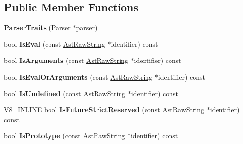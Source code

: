 \subsection*{Public Member Functions}
\begin{DoxyCompactItemize}
\item 
{\bfseries Parser\+Traits} (\hyperlink{classv8_1_1internal_1_1_parser}{Parser} $\ast$parser)\hypertarget{classv8_1_1internal_1_1_parser_traits_abfb6b57f03bde44ebd57ba82060e853c}{}\label{classv8_1_1internal_1_1_parser_traits_abfb6b57f03bde44ebd57ba82060e853c}

\item 
bool {\bfseries Is\+Eval} (const \hyperlink{classv8_1_1internal_1_1_ast_raw_string}{Ast\+Raw\+String} $\ast$identifier) const \hypertarget{classv8_1_1internal_1_1_parser_traits_afba95e19eb7118575931870015f0bf1f}{}\label{classv8_1_1internal_1_1_parser_traits_afba95e19eb7118575931870015f0bf1f}

\item 
bool {\bfseries Is\+Arguments} (const \hyperlink{classv8_1_1internal_1_1_ast_raw_string}{Ast\+Raw\+String} $\ast$identifier) const \hypertarget{classv8_1_1internal_1_1_parser_traits_a604e49310c1454c26b9d67a19098b06d}{}\label{classv8_1_1internal_1_1_parser_traits_a604e49310c1454c26b9d67a19098b06d}

\item 
bool {\bfseries Is\+Eval\+Or\+Arguments} (const \hyperlink{classv8_1_1internal_1_1_ast_raw_string}{Ast\+Raw\+String} $\ast$identifier) const \hypertarget{classv8_1_1internal_1_1_parser_traits_a9a797b80683da1e025032f06da7791f4}{}\label{classv8_1_1internal_1_1_parser_traits_a9a797b80683da1e025032f06da7791f4}

\item 
bool {\bfseries Is\+Undefined} (const \hyperlink{classv8_1_1internal_1_1_ast_raw_string}{Ast\+Raw\+String} $\ast$identifier) const \hypertarget{classv8_1_1internal_1_1_parser_traits_a899e7924d65e4fc73517943797575dff}{}\label{classv8_1_1internal_1_1_parser_traits_a899e7924d65e4fc73517943797575dff}

\item 
V8\+\_\+\+I\+N\+L\+I\+NE bool {\bfseries Is\+Future\+Strict\+Reserved} (const \hyperlink{classv8_1_1internal_1_1_ast_raw_string}{Ast\+Raw\+String} $\ast$identifier) const \hypertarget{classv8_1_1internal_1_1_parser_traits_accd89a1f7c3e9eb5f43c0991bc4f0534}{}\label{classv8_1_1internal_1_1_parser_traits_accd89a1f7c3e9eb5f43c0991bc4f0534}

\item 
bool {\bfseries Is\+Prototype} (const \hyperlink{classv8_1_1internal_1_1_ast_raw_string}{Ast\+Raw\+String} $\ast$identifier) const \hypertarget{classv8_1_1internal_1_1_parser_traits_a063a2f5d01a71be55d8b092dbddf6e01}{}\label{classv8_1_1internal_1_1_parser_traits_a063a2f5d01a71be55d8b092dbddf6e01}


\end{DoxyCompactItemize}
